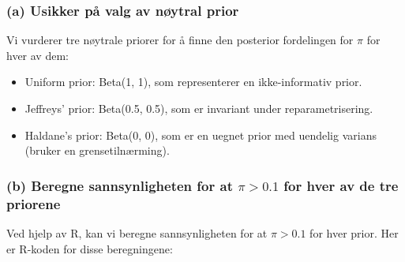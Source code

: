 \documentclass{article}
\begin{document}
\subsubsection*{(a) Usikker på valg av nøytral prior}
Vi vurderer tre nøytrale priorer for å finne den posterior fordelingen for \(\pi\) for hver av dem:

\begin{itemize}
    \item Uniform prior: Beta(1, 1), som representerer en ikke-informativ prior.
    \item Jeffreys' prior: Beta(0.5, 0.5), som er invariant under reparametrisering.
    \item Haldane's prior: Beta(0, 0), som er en uegnet prior med uendelig varians (bruker en grensetilnærming).
\end{itemize}

\subsubsection*{(b) Beregne sannsynligheten for at \(\pi > 0.1\) for hver av de tre priorene}
Ved hjelp av R, kan vi beregne sannsynligheten for at \(\pi > 0.1\) for hver prior. Her er R-koden for disse beregningene:
\end{document}
